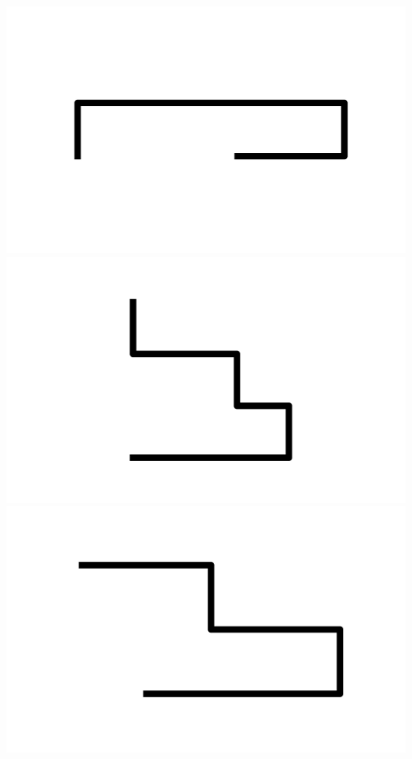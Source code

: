 \documentclass[]{report}
\begin{document}
\includegraphics[scale=.1]{pictures/18/state_cluster_shapes_22.pdf} 
\includegraphics[scale=.1]{pictures/18/state_cluster_shapes_23.pdf} 
\includegraphics[scale=.1]{pictures/18/state_cluster_shapes_24.pdf} 
\end{document}
